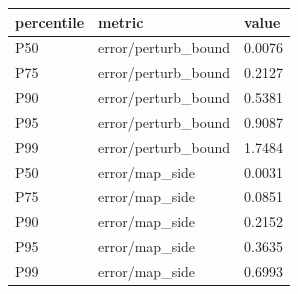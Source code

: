 \begin{tabular}{lll}
\toprule
percentile & metric & value \\
\midrule
P50 & error/perturb_bound & 0.0076 \\
P75 & error/perturb_bound & 0.2127 \\
P90 & error/perturb_bound & 0.5381 \\
P95 & error/perturb_bound & 0.9087 \\
P99 & error/perturb_bound & 1.7484 \\
P50 & error/map_side & 0.0031 \\
P75 & error/map_side & 0.0851 \\
P90 & error/map_side & 0.2152 \\
P95 & error/map_side & 0.3635 \\
P99 & error/map_side & 0.6993 \\
\bottomrule
\end{tabular}
